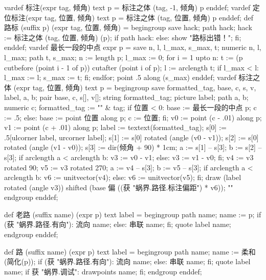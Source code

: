 \startMPinclusions[+]
vardef 标注(expr tag, 倾角) text p =
  标注之体 (tag, -1, 倾角) p
enddef;
vardef 定位标注(expr tag, 位置, 倾角) text p =
  标注之体 (tag, 位置, 倾角) p
enddef;
def 路标 (suffix p) (expr tag, 位置, 倾角) =
  begingroup
    save hack; path hack;
    hack := 标注之体 (tag, 位置, 倾角) (p);
    if path hack:
    else:
      show "路标出错！";
    fi;
enddef;
vardef 最长一段的中点 expr p =
  save n, l, l_max, s_max, t;
  numeric n, l, l_max; path t, s_max;
  n := length p;
  l_max := 0;
  for i = 1 upto n:
    t := (p cutbefore (point i - 1 of p)) cutafter (point i of p);
    l := arclength t;
    if l_max < l:
      l_max := l; s_max := t;
    fi;
  endfor;
  point .5 along (s_max)
enddef;
vardef 标注之体 (expr tag, 位置, 倾角) text p =
  begingroup
    save formatted_tag, base, c, s, v, label, a, b;
    pair base, c, s[], v[]; string formatted_tag; picture label; path a, b; numeric c;
    formatted_tag := "\tfx" & tag;
    if 位置 < 0:
      base := 最长一段的中点 p;
      c := .5;
    else:
      base := point 位置 along p;
      c := 位置;
    fi;
    v0 := point (c - .01) along p;
    v1 := point (c + .01) along p;
    label := textext(formatted_tag);
    s[0] := .5[ulcorner label, urcorner label];
    s[1] := s[0] rotated (angle (v0 - v1));
    s[2] := s[0] rotated (angle (v1 - v0));
    s[3] := dir(倾角 + 90) * 1cm; %
    a := s[1] -- s[3];
    b := s[2] -- s[3];
    if arclength a < arclength b:
      v3 := v0 - v1;
    else:
      v3 := v1 - v0;
    fi;
    v4 := v3 rotated 90;
    v5 := v3 rotated 270;
    a := v4 -- s[3];
    b := v5 -- s[3];
    if arclength a < arclength b:
      v6 := unitvector(v4);
    else:
      v6 := unitvector(v5);
    fi;
    draw (label rotated (angle v3)) shifted (base 偏 ((获 "蜗界.路径.标注偏距") * v6));
    ""
  endgroup
enddef;
\stopMPinclusions

\startMPinclusions[+]
def 老路 (suffix name) (expr p) text label =
  begingroup
  path name; name := p;
  if (获 "蜗界.路径.有向"):
    流向 name;
  else:
    串联 name;
  fi;
  quote label name;
  endgroup
enddef;

def 路 (suffix name) (expr p) text label =
  begingroup
  path name; name := 柔和(简化(p));
  if (获 "蜗界.路径.有向"):
    流向 name;
  else:
    串联 name;
  fi;
  quote label name;
  if 获 "蜗界.调试": drawpoints name; fi;
  endgroup
enddef;
\stopMPinclusions

